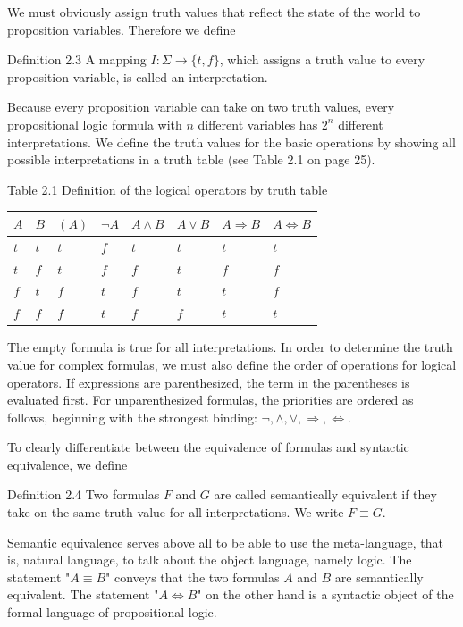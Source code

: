\documentclass[10pt]{book}
\begin{document}
We must obviously assign truth values that reflect the state of the world to proposition variables. Therefore we define

\begin{displayquote}
Definition 2.3 A mapping $I: \Sigma \rightarrow \{t, f\}$, which assigns a truth value to every proposition variable, is called an interpretation.
\end{displayquote}

Because every proposition variable can take on two truth values, every propositional logic formula with $n$ different variables has $2^{n}$ different interpretations. We define the truth values for the basic operations by showing all possible interpretations in a truth table (see Table 2.1 on page 25).

Table 2.1 Definition of the logical operators by truth table
\begin{center}
\begin{tabular}{llllllll}
\hline
$A$ & $B$ & $(A)$ & $\neg A$ & $A \wedge B$ & $A \vee B$ & $A \Rightarrow B$ & $A \Leftrightarrow B$ \\
\hline
$t$ & $t$ & $t$ & $f$ & $t$ & $t$ & $t$ & $t$ \\
\hline
$t$ & $f$ & $t$ & $f$ & $f$ & $t$ & $f$ & $f$ \\
\hline
$f$ & $t$ & $f$ & $t$ & $f$ & $t$ & $t$ & $f$ \\
\hline
$f$ & $f$ & $f$ & $t$ & $f$ & $f$ & $t$ & $t$ \\
\hline
\end{tabular}
\end{center}

The empty formula is true for all interpretations. In order to determine the truth value for complex formulas, we must also define the order of operations for logical operators. If expressions are parenthesized, the term in the parentheses is evaluated first. For unparenthesized formulas, the priorities are ordered as follows, beginning with the strongest binding: $\neg, \wedge, \vee, \Rightarrow, \Leftrightarrow$.

To clearly differentiate between the equivalence of formulas and syntactic equivalence, we define

Definition 2.4 Two formulas $F$ and $G$ are called semantically equivalent if they take on the same truth value for all interpretations. We write $F \equiv G$.

Semantic equivalence serves above all to be able to use the meta-language, that is, natural language, to talk about the object language, namely logic. The statement "$A \equiv B$" conveys that the two formulas $A$ and $B$ are semantically equivalent. The statement "$A \Leftrightarrow B$" on the other hand is a syntactic object of the formal language of propositional logic.
\end{document}
